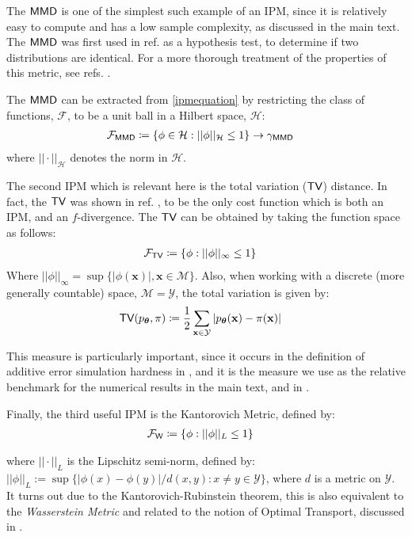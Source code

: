 The $\operatorname{\textsf{MMD}}$ is one of the simplest such example of an IPM, since it is relatively easy to compute and has a low sample complexity, as discussed in the main text. The $\operatorname{\textsf{MMD}}$ was first used in ref. as a hypothesis test, to determine if two distributions are identical. For a more thorough treatment of the properties of this metric, see refs. .  

The $\operatorname{\textsf{MMD}}$ can be extracted from \eqref{ipmequation} by restricting the class of functions, $\mathcal{F}$, to be a unit ball in a Hilbert space, $\mathcal{H}$:
\begin{align}
\mathcal{F}_{\operatorname{\textsf{MMD}}} &  \coloneqq \{\phi \in \mathcal{H}: ||\phi||_{\mathcal{H}}\leq 1\} \rightarrow \gamma_{\operatorname{\textsf{MMD}}} \label{mmd_metric_supp}
\end{align}
where $||\cdot||_{\mathcal{H}}$ denotes the norm in $\mathcal{H}$.

The second IPM which is relevant here is the total variation ($\operatorname{\textsf{TV}}$) distance. In fact, the $\operatorname{\textsf{TV}}$ was shown in ref. , to be the only cost function which is both an IPM, and an $f$-divergence. The $\operatorname{\textsf{TV}}$ can be obtained by taking the function space as follows:
\begin{align}
    \mathcal{F}_{\operatorname{\textsf{TV}}} &  \coloneqq \{\phi: ||\phi||_{\infty} \leq 1\} \label{totalvariationfunctions}
\end{align}
Where $||\phi||_{\infty} = \sup\{|\phi(\mathbf{x})|, \mathbf{x} \in \mathcal{M}\}$. Also, when working with a discrete (more generally countable) space, $\mathcal{M} = \mathcal{Y}$, the total variation is given by:
\begin{align}
\operatorname{\textsf{TV}}(p_{\boldsymbol\theta}, \pi) &  \coloneqq  \frac{1}{2}\sum\limits_{\mathbf{x} \in \mathcal{Y}}|p_{\boldsymbol\theta}(\mathbf{x})- \pi(\mathbf{x})| \label{discretetotalvariation}
\end{align}

This measure is particularly important, since it occurs in the definition of additive error simulation hardness in , and it is the measure we use as the relative benchmark for the numerical results in the main text, and in .

Finally, the third useful IPM is the Kantorovich Metric, defined by:
\begin{align}
    \mathcal{F}_{\operatorname{\textsf{W}}} &  \coloneqq \{\phi: ||\phi||_{L} \leq 1\} \label{kantorovichmetric}
\end{align}


where $||\cdot||_{L}$ is the Lipschitz semi-norm, defined by: $||\phi||_{L} := \sup\{|\phi(x) - \phi(y)|/d(x,y) : x\neq{y} \in \mathcal{Y}\}$, where $d$ is a metric on $\mathcal{Y}$. It turns out due to the Kantorovich-Rubinstein theorem, this is also equivalent to the \textit{Wasserstein Metric} and related to the notion of Optimal Transport, discussed in .

